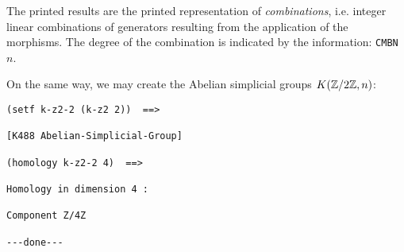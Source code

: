 The printed results are the printed representation of {\em combinations}, i.e.
integer linear combinations of generators resulting from the application of the
morphisms. The degree of the combination is indicated by the information: {\tt CMBN $n$}.
\par
On the same way, we may create the Abelian simplicial groups $K({\mathbb{Z}}/2{\mathbb{Z}}, n)$:
{\footnotesize\begin{verbatim}
(setf k-z2-2 (k-z2 2))  ==>

[K488 Abelian-Simplicial-Group]

(homology k-z2-2 4)  ==>

Homology in dimension 4 :

Component Z/4Z

---done---
\end{verbatim}}

